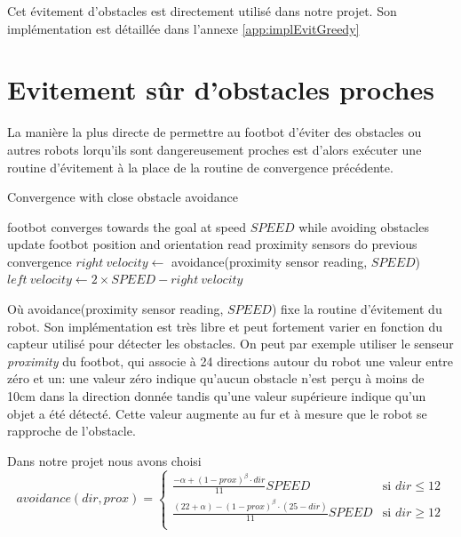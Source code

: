 Cet évitement d'obstacles est directement utilisé dans notre projet. Son implémentation est détaillée dans l'annexe \ref{app:implEvitGreedy}

\section{Evitement sûr d'obstacles proches\label{sec:emerAvoid}}

La manière la plus directe de permettre au footbot d'éviter des obstacles ou autres robots lorqu'ils sont dangereusement proches est d'alors exécuter une routine d'évitement à la place de la routine de convergence précédente.
\begin{algorithm}
\label{obstacleConvergence}
\caption{Convergence with close obstacle avoidance}
\begin{algorithmic}
  \ENSURE footbot converges towards the goal at speed \(SPEED\) while avoiding obstacles
    \STATE update footbot position and orientation
    \STATE read proximity sensors 
      \STATE do previous convergence
    \ELSE
      \STATE \( right\:velocity \leftarrow\) avoidance(proximity sensor reading, \(SPEED\))
    \ENDIF
    \STATE \( left\:velocity \leftarrow 2 \times SPEED-right\:velocity\) 
  \ENDWHILE
\end{algorithmic}
\end{algorithm}

Où avoidance(proximity sensor reading, $SPEED$) fixe la routine d'évitement du robot. Son implémentation est très libre et peut fortement varier en fonction du capteur utilisé pour détecter les obstacles. On peut par exemple utiliser le senseur \emph{proximity} du footbot, qui associe à 24 directions autour du robot une valeur entre zéro et un: une valeur zéro indique qu'aucun obstacle n'est perçu à moins de 10cm dans la direction donnée tandis qu'une valeur supérieure indique qu'un objet a été détecté. Cette valeur augmente au fur et à mesure que le robot se rapproche de l'obstacle.~\cite{argosSite1}

Dans notre projet nous avons choisi
\[avoidance(dir, prox)=
  \begin{cases}
      \frac{-\alpha +(1-prox)^{\beta}\cdot dir}{11}SPEED & \text{si }dir \leq 12\\
      \frac{(22+\alpha )-(1-prox)^{\beta}\cdot (25-dir)}{11}SPEED & \text{si }dir \geq 12\\
  \end{cases}
\]

